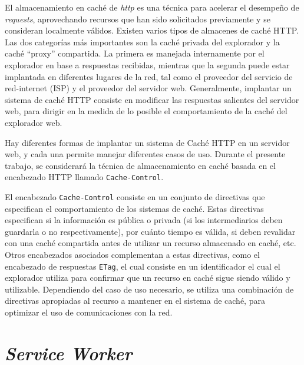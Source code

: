 El almacenamiento en caché de \textit{http} es una técnica para acelerar el desempeño de \textit{requests}, aprovechando recursos que han sido solicitados previamente y se consideran localmente válidos. Existen varios tipos de almacenes de caché HTTP. Las dos categorías más importantes son la caché privada del explorador y la caché ``proxy'' compartida. La primera es manejada internamente por el explorador en base a respuestas recibidas, mientras que la segunda puede estar implantada en diferentes lugares de la red, tal como el proveedor del servicio de red-internet (ISP) y el proveedor del servidor web. Generalmente, implantar un sistema de caché HTTP consiste en modificar las respuestas salientes del servidor web, para dirigir en la medida de lo posible el comportamiento de la caché del explorador web.

Hay diferentes formas de implantar un sistema de Caché HTTP en un servidor web, y cada una permite manejar diferentes casos de uso. Durante el presente trabajo, se considerará la técnica de almacenamiento en caché basada en el encabezado HTTP llamado \texttt{Cache-Control}.

El encabezado \texttt{Cache-Control} consiste en un conjunto de directivas que especifican el comportamiento de los sistemas de caché. Estas directivas especifican si la información es pública o privada (si los intermediarios deben guardarla o no respectivamente), por cuánto tiempo es válida, si deben revalidar con una caché compartida antes de utilizar un recurso almacenado en caché, etc. Otros encabezados asociados complementan a estas directivas, como el encabezado de respuestas \texttt{ETag}, el cual consiste en un identificador el cual el explorador utiliza para confirmar que un recurso en caché sigue siendo válido y utilizable. Dependiendo del caso de uso necesario, se utiliza una combinación de directivas apropiadas al recurso a mantener en el sistema de caché, para optimizar el uso de comunicaciones con la red.

\section{\textit{Service Worker}}

